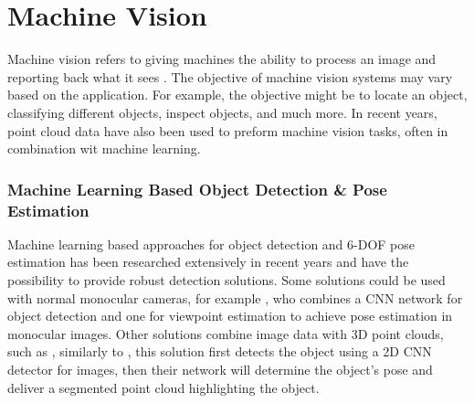 

\section{Machine Vision} \label{sec:T:MachineVision}
Machine vision refers to giving machines the ability to process an image and reporting back what it sees \cite{SnyderWesleyE.2010Mv}. The objective of machine vision systems may vary based on the application. For example, the objective might be to locate an object, classifying different objects, inspect objects, and much more. In recent years, point cloud data have also been used to preform machine vision tasks, often in combination wit machine learning.

\subsubsection{Machine Learning Based Object Detection \& Pose Estimation}
Machine learning based approaches for object detection and 6-DOF pose estimation has been researched extensively in recent years and have the possibility to provide robust detection solutions. Some solutions could be used with normal monocular cameras, for example \cite{JosipKerzel2018}, who combines a CNN network for object detection and one for viewpoint estimation to achieve pose estimation in monocular images. Other solutions combine image data with 3D point clouds, such as \cite{WeiDuan2020}, similarly to \cite{JosipKerzel2018}, this solution first detects the object using a 2D CNN detector for images, then their network will determine the object's pose and deliver a segmented point cloud highlighting the object.

